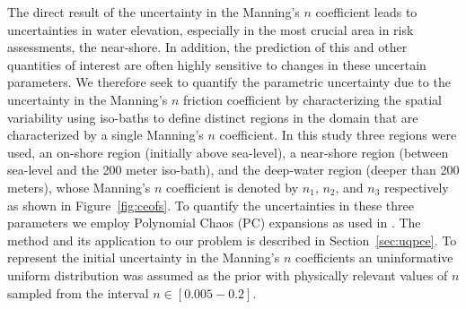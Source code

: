 The direct result of the uncertainty in the Manning's $n$ coefficient leads to
uncertainties in water elevation,
especially in the most crucial area in risk assessments, the near-shore. In 
addition,  the prediction of this and other quantities of interest are often highly 
sensitive to changes in these uncertain parameters.  We therefore seek to 
quantify the parametric uncertainty due to the uncertainty in the Manning's $n$ 
friction coefficient by characterizing the spatial variability using
iso-baths to define distinct regions in the domain that are characterized by a
single Manning's $n$ coefficient.  In this study three regions were used, an
on-shore region (initially above sea-level), a near-shore region (between
sea-level and the 200 meter iso-bath), and the deep-water region (deeper than
200 meters), whose Manning's $n$ coefficient is denoted by $n_1$, $n_2$, and $n_3$ respectively 
as shown in Figure~\ref{fig:ceofs}. To quantify the uncertainties
in these three parameters we employ Polynomial Chaos (PC) 
expansions as used in \cite{sraj:2013a,sraj:2013b}.  The method and its 
application to our problem is
described in Section~\ref{sec:uqpce}.  To represent the initial uncertainty in the
Manning's $n$ coefficients an uninformative uniform distribution was assumed as 
the prior with physically relevant values of $n$ sampled from the interval 
$n \in [0.005-0.2]$.
